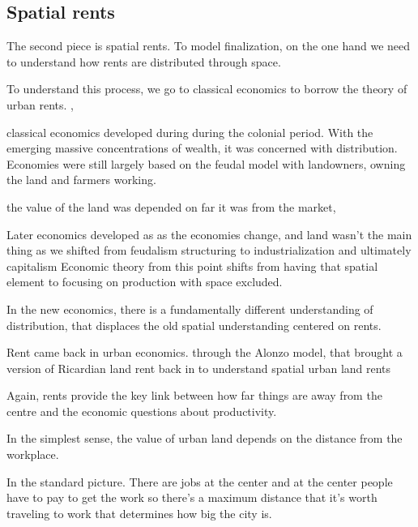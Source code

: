 \documentclass[]{article}
\begin{document}
\subsection{Spatial rents}
The second piece is spatial rents. 
To model finalization, on the one hand we need to understand how rents are distributed through space.

To understand this process, we   go to classical economics to borrow the theory of urban rents. ,  %




classical economics developed during during the colonial period. With the emerging massive concentrations of wealth, it was 
concerned with distribution. Economies were still largely based on the feudal model with landowners, owning the land and farmers working.

the value of the land was depended on far it was from the market, 

Later economics developed as as the economies change, and land wasn't the main thing as we shifted from feudalism structuring to industrialization and ultimately capitalism
Economic theory from this point shifts from having that spatial element to focusing on production with space excluded.

In the new economics, there is a fundamentally different understanding of distribution, that displaces the old spatial understanding centered on rents. 


Rent came back in urban economics. through the Alonzo model, 
that brought  a version of Ricardian land rent back in to understand spatial urban land rents 

Again, rents provide the key link between how far things are away from the centre and the economic questions about productivity. 

In the simplest sense, the value of urban land depends on the distance from the workplace. 

In  the standard picture. There are jobs at the center and at the center people have to pay to get the work so 
there's a maximum distance that it's worth traveling to work
that determines how big the city is.
\end{document}
